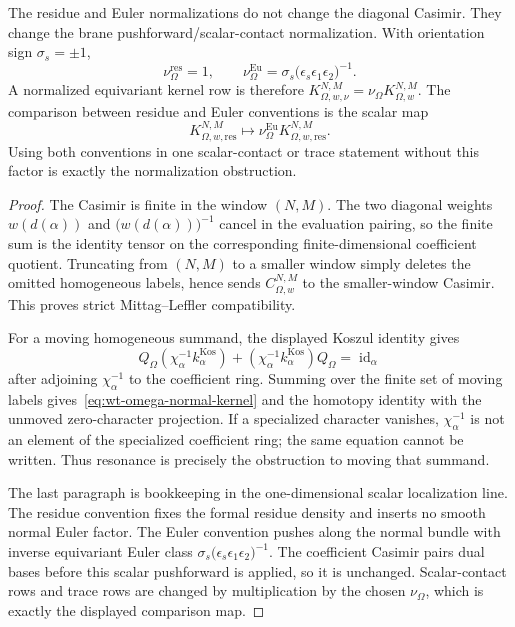 \begin{thm}
  The residue and Euler normalizations do not change the diagonal Casimir.
  They change the brane pushforward/scalar-contact normalization.  With
  orientation sign \(\sigma_s=\pm1\),
  \[
    \nu_\Omega^{\mathrm{res}}=1,\qquad
    \nu_\Omega^{\mathrm{Eu}}
      =
    \sigma_s\bigl(\epsilon_s\epsilon_1\epsilon_2\bigr)^{-1}.
  \]
  A normalized equivariant kernel row is therefore
  \(K_{\Omega,w,\nu}^{N,M}=\nu_\Omega K_{\Omega,w}^{N,M}\).  The comparison
  between residue and Euler conventions is the scalar map
  \[
    K_{\Omega,w,\mathrm{res}}^{N,M}
      \longmapsto
    \nu_\Omega^{\mathrm{Eu}}K_{\Omega,w,\mathrm{res}}^{N,M}.
  \]
  Using both conventions in one scalar-contact or trace statement without
  this factor is exactly the normalization obstruction.
\end{thm}

\begin{proof}
  The Casimir is finite in the window \((N,M)\).  The two diagonal weights
  \(w(d(\alpha))\) and \(\bigl(w(d(\alpha))\bigr)^{-1}\) cancel in the
  evaluation pairing, so the finite sum is the identity tensor on the
  corresponding finite-dimensional coefficient quotient.  Truncating from
  \((N,M)\) to a smaller window simply deletes the omitted homogeneous
  labels, hence sends \(C_{\Omega,w}^{N,M}\) to the smaller-window Casimir.
  This proves strict Mittag--Leffler compatibility.

  For a moving homogeneous summand, the displayed Koszul identity gives
  \[
    Q_\Omega(\chi_\alpha^{-1}k^{\mathrm{Kos}}_\alpha)
      +(\chi_\alpha^{-1}k^{\mathrm{Kos}}_\alpha)Q_\Omega
      =
    \operatorname{id}_\alpha
  \]
  after adjoining \(\chi_\alpha^{-1}\) to the coefficient ring.  Summing
  over the finite set of moving labels gives~\eqref{eq:wt-omega-normal-kernel}
  and the homotopy identity with the
  unmoved zero-character projection.  If a specialized character vanishes,
  \(\chi_\alpha^{-1}\) is not an element of the specialized coefficient
  ring; the same equation cannot be written.  Thus resonance is precisely
  the obstruction to moving that summand.

  The last paragraph is bookkeeping in the one-dimensional scalar
  localization line.  The residue convention fixes the formal residue
  density and inserts no smooth normal Euler factor.  The Euler convention
  pushes along the normal bundle with inverse equivariant Euler class
  \(\sigma_s\bigl(\epsilon_s\epsilon_1\epsilon_2\bigr)^{-1}\).  The coefficient
  Casimir pairs dual bases before this scalar pushforward is applied, so it
  is unchanged.  Scalar-contact rows and trace rows are changed by
  multiplication by the chosen \(\nu_\Omega\), which is exactly the
  displayed comparison map.
\end{proof}

